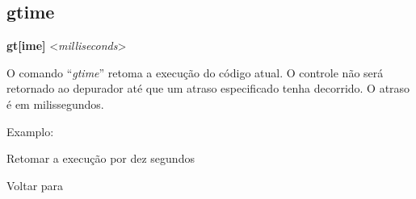 \documentclass[letterpaper,10pt,brazil]{sphinxmanual}
\begin{document}
\subsection{gtime}
\label{debugger/execution:debugger-command-gtime}\label{debugger/execution:gtime}
\begin{DUlineblock}{0em}
\item[]
\begin{DUlineblock}{\DUlineblockindent}
\item[] \textbf{gt{[}ime{]}} \textless{}\emph{milliseconds}\textgreater{}
\item[] 
\end{DUlineblock}
\item[] O comando ``\emph{gtime}'' retoma a execução do código atual. O controle não será retornado ao depurador até que um atraso especificado tenha decorrido. O atraso é em milissegundos.
\item[] 
\item[] Examplo:
\item[] 
\item[]
\begin{DUlineblock}{\DUlineblockindent}
\item[] 
\item[] 
\end{DUlineblock}
\item[] Retomar a execução por dez segundos
\item[] 
\item[] Voltar para {\hyperref[debugger/execution:debugger\string-execution\string-list]{}}
\end{DUlineblock}
\begin{quote}
\label{debugger/execution:debugger-command-next}\end{quote}
\end{document}
